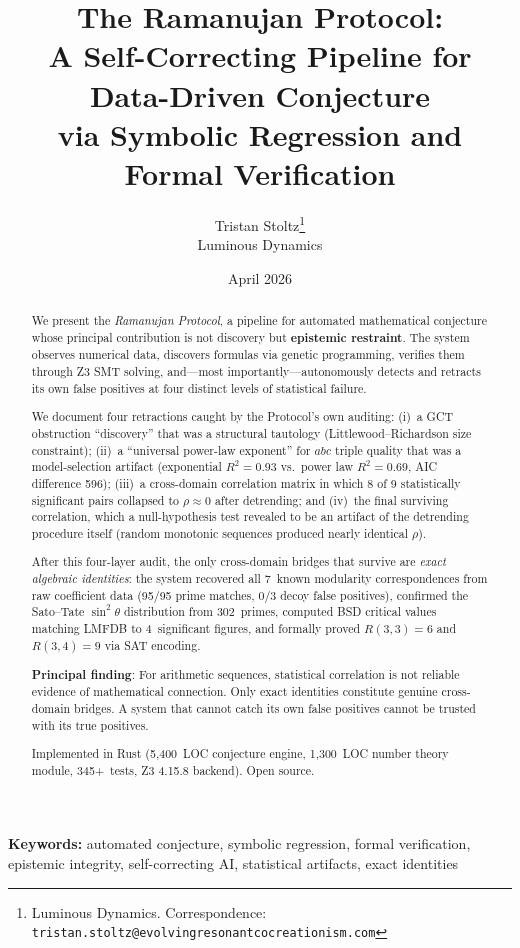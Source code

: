 \documentclass[11pt,a4paper]{article}
\title{%
  \textbf{The Ramanujan Protocol:}\\
  A Self-Correcting Pipeline for Data-Driven Conjecture\\
  via Symbolic Regression and Formal Verification
}
\author{
  Tristan Stoltz\thanks{Luminous Dynamics. Correspondence: \texttt{tristan.stoltz@evolvingresonantcocreationism.com}} \\
  Luminous Dynamics
}
\date{April 2026}
\begin{document}
\maketitle

\begin{abstract}
We present the \emph{Ramanujan Protocol}, a pipeline for automated
mathematical conjecture whose principal contribution is not discovery
but \textbf{epistemic restraint}. The system observes numerical data,
discovers formulas via genetic programming, verifies them through Z3
SMT solving, and---most importantly---autonomously detects and retracts
its own false positives at four distinct levels of statistical failure.

We document four retractions caught by the Protocol's own auditing:
(i)~a GCT obstruction ``discovery'' that was a structural tautology
(Littlewood--Richardson size constraint);
(ii)~a ``universal power-law exponent'' for $abc$ triple quality that was
a model-selection artifact (exponential $R^2{=}0.93$ vs.\ power law
$R^2{=}0.69$, AIC difference 596);
(iii)~a cross-domain correlation matrix in which 8 of 9 statistically
significant pairs collapsed to $\rho \approx 0$ after detrending; and
(iv)~the final surviving correlation, which a null-hypothesis test
revealed to be an artifact of the detrending procedure itself (random
monotonic sequences produced nearly identical $\rho$).

After this four-layer audit, the only cross-domain bridges that survive
are \emph{exact algebraic identities}: the system recovered all 7~known
modularity correspondences from raw coefficient data (95/95 prime
matches, 0/3 decoy false positives), confirmed the Sato--Tate
$\sin^2\theta$ distribution from 302~primes, computed BSD critical
values matching LMFDB to 4~significant figures, and formally proved
$R(3,3) = 6$ and $R(3,4) = 9$ via SAT encoding.

\textbf{Principal finding}: For arithmetic sequences, statistical
correlation is not reliable evidence of mathematical connection. Only
exact identities constitute genuine cross-domain bridges. A system that
cannot catch its own false positives cannot be trusted with its true
positives.

Implemented in Rust (5{,}400~LOC conjecture engine, 1{,}300~LOC
number theory module, 345+~tests, Z3 4.15.8 backend). Open source.
\end{abstract}

\textbf{Keywords:} automated conjecture, symbolic regression, formal
verification, epistemic integrity, self-correcting AI, statistical
artifacts, exact identities
\end{document}
